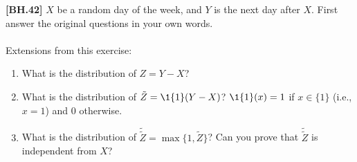 \begin{exercise}
	\textbf{[BH.42]} $X$ be a random day of the week, and $Y$ is the next day after $X$. First answer the original questions in your own words.\\~\\
	Extensions from this exercise:
\begin{enumerate}
	\item What is the distribution of $Z=Y-X$? 
	\item What is the distribution of $\tilde{Z}=
	\1 {\{1\}} (Y-X)$? $\1{\{1\}}(x)=1$ if $x\in\{1\}$ (i.e.,$x=1$) and $0$ otherwise.
	\item What is the distribution of $\tilde{\tilde{Z}}=\max\{1,\tilde{Z}\}$? Can you prove that $\tilde{\tilde{Z}}$ is independent from $X$?
\end{enumerate}
\end{exercise}